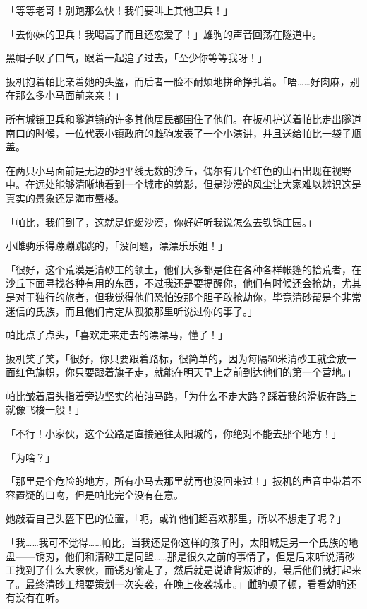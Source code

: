 「等等老哥！别跑那么快！我们要叫上其他卫兵！」

「去你妹的卫兵！我喝高了而且还恋爱了！」雄驹的声音回荡在隧道中。

黑帽子叹了口气，跟着一起追了过去，「至少你等等我呀！」

\horizonline


扳机抱着帕比亲着她的头盔，而后者一脸不耐烦地拼命挣扎着。「唔……好肉麻，别在那么多小马面前亲亲！」

所有城镇卫兵和隧道镇的许多其他居民都围住了他们。在扳机护送着帕比走出隧道南口的时候，一位代表小镇政府的雌驹发表了一个小演讲，并且送给帕比一袋子瓶盖。

在两只小马面前是无边的地平线无数的沙丘，偶尔有几个红色的山石出现在视野中。在远处能够清晰地看到一个城市的剪影，但是沙漠的风尘让大家难以辨识这是真实的景象还是海市蜃楼。

「帕比，我们到了，这就是蛇蝎沙漠，你好好听我说怎么去铁锈庄园。」

小雌驹乐得蹦蹦跳跳的，「没问题，漂漂乐乐姐！」

「很好，这个荒漠是清砂工的领土，他们大多都是住在各种各样帐篷的拾荒者，在沙丘下面寻找各种有用的东西，不过我还是要提醒你，他们有时候还会抢劫，尤其是对于独行的旅者，但我觉得他们恐怕没那个胆子敢抢劫你，毕竟清砂帮是个非常迷信的氏族，而且他们肯定从孤狼那里听说过你的事了。」

帕比点了点头，「喜欢走来走去的漂漂马，懂了！」

扳机笑了笑，「很好，你只要跟着路标，很简单的，因为每隔50米清砂工就会放一面红色旗帜，你只要跟着旗子走，就能在明天早上之前到达他们的第一个营地。」

帕比皱着眉头指着旁边坚实的柏油马路，「为什么不走大路？踩着我的滑板在路上就像飞梭一般！」

「不行！小家伙，这个公路是直接通往太阳城的，你绝对不能去那个地方！」

「为啥？」

「那里是个危险的地方，所有小马去那里就再也没回来过！」扳机的声音中带着不容置疑的口吻，但是帕比完全没有在意。

她敲着自己头盔下巴的位置，「呃，或许他们超喜欢那里，所以不想走了呢？」

「我……我可不觉得……帕比，当我还是你这样的孩子时，太阳城是另一个氏族的地盘——锈刃，他们和清砂工是同盟……那是很久之前的事情了，但是后来听说清砂工找到了什么大家伙，而锈刃偷走了，然后就是说谁背叛谁的，最后他们就打起来了。最终清砂工想要策划一次突袭，在晚上夜袭城市。」雌驹顿了顿，看看幼驹还有没有在听。

